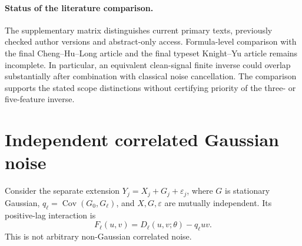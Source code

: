 \documentclass[11pt,a4paper]{article}
\theoremstyle{remark}\newtheorem{remark}[theorem]{Remark}
\DeclareMathOperator{\Cov}{Cov}\DeclareMathOperator{\Var}{Var}
\begin{document}
\paragraph{Status of the literature comparison.}
The supplementary matrix distinguishes current primary texts, previously checked author versions and abstract-only access. Formula-level comparison with the final Cheng--Hu--Long article and the final typeset Knight--Yu article remains incomplete. In particular, an equivalent clean-signal finite inverse could overlap substantially after combination with classical noise cancellation. The comparison supports the stated scope distinctions without certifying priority of the three- or five-feature inverse.

\section{Independent correlated Gaussian noise}\label{app:gaussian}
Consider the separate extension $Y_j=X_j+G_j+\varepsilon_j$, where $G$ is stationary Gaussian, $q_\ell=\Cov(G_0,G_\ell)$, and $X,G,\varepsilon$ are mutually independent. Its positive-lag interaction is
\begin{equation}\label{eq:gaussian}
F_\ell(u,v)=D_\ell(u,v;\theta)-q_\ell uv.
\end{equation}
This is not arbitrary non-Gaussian correlated noise.
\end{document}
